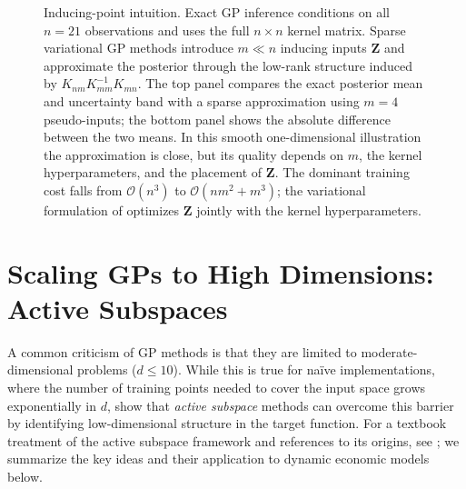 \documentclass[11pt,a4paper]{report}
\begin{document}
\begin{figure}[ht]
\caption{Inducing-point intuition.  Exact GP inference conditions on all $n=21$ observations and uses the full $n\times n$ kernel matrix.  Sparse variational GP methods introduce $m\ll n$ inducing inputs $\bm Z$ and approximate the posterior through the low-rank structure induced by $K_{nm}K_{mm}^{-1}K_{mn}$.  The top panel compares the exact posterior mean and uncertainty band with a sparse approximation using $m=4$ pseudo-inputs; the bottom panel shows the absolute difference between the two means.  In this smooth one-dimensional illustration the approximation is close, but its quality depends on $m$, the kernel hyperparameters, and the placement of $\bm Z$.  The dominant training cost falls from $\mathcal{O}(n^3)$ to $\mathcal{O}(nm^2 + m^3)$; the variational formulation of \citet{titsias2009variational} optimizes $\bm Z$ jointly with the kernel hyperparameters.}
\label{fig:inducing_points}
\end{figure}

\section{Scaling GPs to High Dimensions: Active Subspaces}
\label{sec:active_subspaces}

A common criticism of GP methods is that they are limited to moderate-dimensional problems ($d \leq 10$).  While this is true for na\"ive implementations, where the number of training points needed to cover the input space grows exponentially in $d$, \citet{SCHEIDEGGER201968} show that \emph{active subspace} methods can overcome this barrier by identifying low-dimensional structure in the target function.  For a textbook treatment of the active subspace framework and references to its origins, see \citet{constantine2015active}; we summarize the key ideas and their application to dynamic economic models below.
\end{document}
